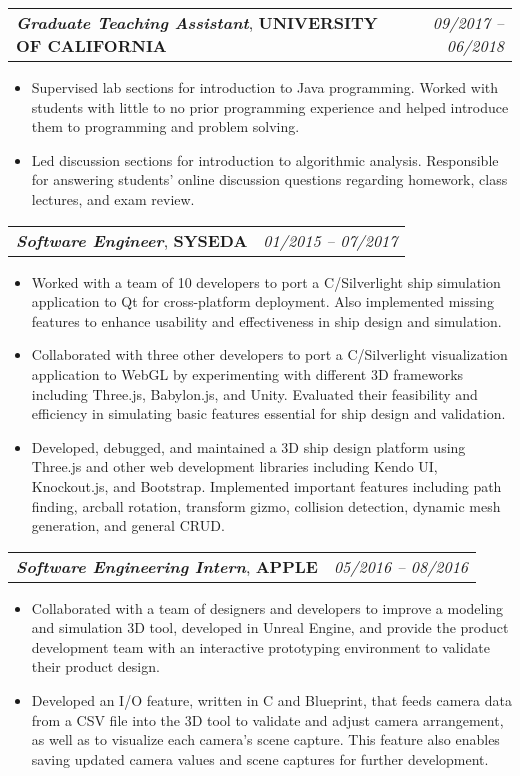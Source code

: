 \documentclass[letterpaper,11pt]{article}
\makeatletter
\newcommand{\resumeItem}[1]{
  \item \small{#1}
}
\newcommand{\resumeExperienceSubheading}[3]{
  \vspace{-1pt}\item
    \begin{tabular*}{0.97\textwidth}[t]{l@{\extracolsep{\fill}}r}
      \textbf{\textit{#1}}, \textbf{#2} & \textit{#3} \\
    \end{tabular*}\vspace{-5pt}
}
\newcommand{\resumeItemListStart}{\begin{itemize}}
\newcommand{\resumeItemListEnd}{\end{itemize}\vspace{-5pt}}
\def\CPlusPlus{{C\nolinebreak[4]\hspace{-.05em}\raisebox{.4ex}{\tiny\bf ++}}}
\def\CSharp{{C\nolinebreak[4]\hspace{-.05em}\raisebox{.4ex}{\tiny\bf \#}}}
\makeatother
\begin{document}
    \resumeExperienceSubheading
      {Graduate Teaching Assistant}{UNIVERSITY OF CALIFORNIA}{09/2017 -- 06/2018}
      \resumeItemListStart
        \resumeItem
          {Supervised lab sections for introduction to Java programming. Worked with students with little to no prior programming 
          experience and helped introduce them to programming and problem solving.}
        \resumeItem
          {Led discussion sections for introduction to algorithmic analysis. Responsible for answering students' online discussion 
          questions regarding homework, class lectures, and exam review.}
      \resumeItemListEnd

      \resumeExperienceSubheading
      {Software Engineer}{SYSEDA}{01/2015 -- 07/2017}
      \resumeItemListStart
        \resumeItem
          {Worked with a team of 10 developers to port a \CSharp/Silverlight ship simulation application to Qt for cross-platform deployment. 
          Also implemented missing features to enhance usability and effectiveness in ship design and 
          simulation.}
        \resumeItem
          {Collaborated with three other developers to port a \CSharp/Silverlight visualization application to WebGL by experimenting with 
          different 3D frameworks including Three.js, Babylon.js, and Unity. Evaluated their feasibility and efficiency in simulating 
          basic features essential for ship design and validation.}
        \resumeItem
          {Developed, debugged, and maintained a 3D ship design platform using Three.js and other web development libraries including Kendo UI, 
          Knockout.js, and Bootstrap. Implemented important features including path finding, arcball rotation, transform gizmo, collision 
          detection, dynamic mesh generation, and general CRUD.}
      \resumeItemListEnd

      \resumeExperienceSubheading
      {Software Engineering Intern}{APPLE}{05/2016 -- 08/2016}
      \resumeItemListStart
        \resumeItem
          {Collaborated with a team of designers and developers to improve a modeling and simulation 3D tool, developed in 
          Unreal Engine, and provide the product development team with an interactive prototyping environment to validate their 
          product design.}
        \resumeItem
          {Developed an I/O feature, written in {\CPlusPlus} and Blueprint, that feeds camera data from a CSV file into the 3D tool to 
          validate and adjust camera arrangement, as well as to visualize each camera's scene capture. This feature also enables saving 
          updated camera values and scene captures for further development.}
      \resumeItemListEnd
\end{document}
